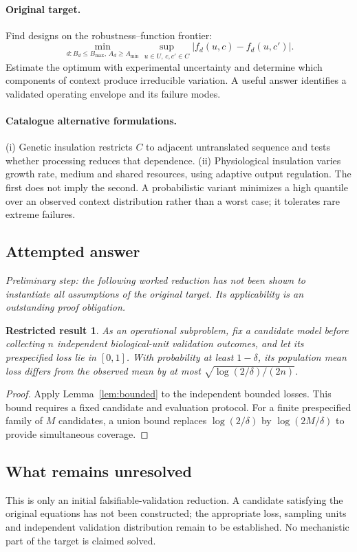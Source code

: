 \documentclass[11pt]{article}
\newtheorem{attemptresult}{Restricted result}[section]
\begin{document}
\paragraph{Original target.}
Find designs on the robustness--function frontier:
\[
\min_{d:B_d\leq B_{\max},\,A_d\geq A_{\min}}
\sup_{u\in U,\,c,c'\in C}|f_d(u,c)-f_d(u,c')|.
\]
Estimate the optimum with experimental uncertainty and determine which components of context produce irreducible variation. A useful answer identifies a validated operating envelope and its failure modes.
\paragraph{Catalogue alternative formulations.}
(i) Genetic insulation restricts $C$ to adjacent untranslated sequence and tests whether processing reduces that dependence. (ii) Physiological insulation varies growth rate, medium and shared resources, using adaptive output regulation. The first does not imply the second. A probabilistic variant minimizes a high quantile over an observed context distribution rather than a worst case; it tolerates rare extreme failures.
\subsection{Attempted answer}
\noindent\emph{Preliminary step: the following worked reduction has not been shown to instantiate all assumptions of the original target. Its applicability is an outstanding proof obligation.}

\begin{attemptresult}
As an operational subproblem, fix a candidate model before collecting $n$ independent biological-unit validation outcomes, and let its prespecified loss lie in $[0,1]$. With probability at least $1-\delta$, its population mean loss differs from the observed mean by at most $\sqrt{\log(2/\delta)/(2n)}$.
\end{attemptresult}
\begin{proof}
Apply Lemma~\ref{lem:bounded} to the independent bounded losses. This bound requires a fixed candidate and evaluation protocol. For a finite prespecified family of $M$ candidates, a union bound replaces $\log(2/\delta)$ by $\log(2M/\delta)$ to provide simultaneous coverage.
\end{proof}
\subsection{What remains unresolved}
This is only an initial falsifiable-validation reduction. A candidate satisfying the original equations has not been constructed; the appropriate loss, sampling units and independent validation distribution remain to be established. No mechanistic part of the target is claimed solved.
\end{document}
